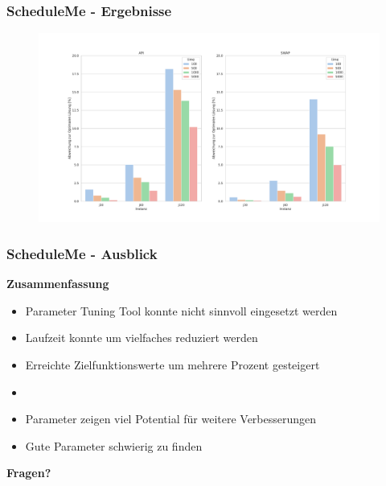 \documentclass[aspectratio=169]{beamer}
\begin{document}
\begin{frame}
	\frametitle{ScheduleMe - Ergebnisse}
	\begin{figure}
		\centering
		\includegraphics[scale=0.29]{result1.pdf}
	\end{figure}	
\end{frame}


\begin{frame}
\frametitle{ScheduleMe - Ausblick}
\textbf{Zusammenfassung}

\begin{itemize}
	\item Parameter Tuning Tool konnte nicht sinnvoll eingesetzt werden
	\item Laufzeit konnte um vielfaches reduziert werden
	\item Erreichte Zielfunktionswerte um mehrere Prozent gesteigert
	\item[]
	\item Parameter zeigen viel Potential für weitere Verbesserungen
	\item Gute Parameter schwierig zu finden \pause
\end{itemize}
\centering
\textbf{Fragen?}
\end{frame}
\end{document}

